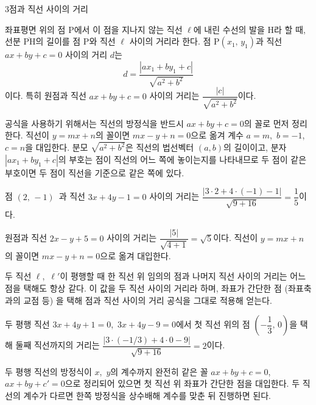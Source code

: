 \documentclass[10pt]{article}
\begin{document}
\begin{dmconcept}{3}{점과 직선 사이의 거리}
\setlength{\parskip}{2.0mm plus 2.1mm minus 0mm}\linespread{1.30}\selectfont%


좌표평면 위의 점 $\mathrm{P}$에서 이 점을 지나지 않는 직선 $\ell$에 내린 수선의 발을 $\mathrm{H}$라 할 때, 선분 $\overline{\mathrm{PH}}$의 길이를 점 $\mathrm{P}$와 직선 $\ell$ 사이의 거리라 한다. 점 $\mathrm{P}(x_1,\, y_1)$과 직선 $ax + by + c = 0$ 사이의 거리 $d$는
\begin{equation*}
  d = \frac{|ax_1 + by_1 + c|}{\sqrt{a^2 + b^2}}
\end{equation*}
이다. 특히 원점과 직선 $ax + by + c = 0$ 사이의 거리는 $\dfrac{|c|}{\sqrt{a^2 + b^2}}$이다.

\begin{dmexplain}
공식을 사용하기 위해서는 직선의 방정식을 반드시 $ax + by + c = 0$의 꼴로 먼저 정리한다. 직선이 $y = mx + n$의 꼴이면 $mx - y + n = 0$으로 옮겨 계수 $a = m$,\ $b = -1$,\ $c = n$을 대입한다. 분모 $\sqrt{a^2 + b^2}$은 직선의 법선벡터 $(a, b)$의 길이이고, 분자 $|ax_1 + by_1 + c|$의 부호는 점이 직선의 어느 쪽에 놓이는지를 나타내므로 두 점이 같은 부호이면 두 점이 직선을 기준으로 같은 쪽에 있다.
\end{dmexplain}

\begin{dmexample}
점 $(2,\, -1)$\ 과 직선 $3x + 4y - 1 = 0$ 사이의 거리는 $\dfrac{|3 \cdot 2 + 4 \cdot (-1) - 1|}{\sqrt{9 + 16}} = \dfrac{1}{5}$이다.
\end{dmexample}

\begin{dmexample}
원점과 직선 $2x - y + 5 = 0$ 사이의 거리는 $\dfrac{|5|}{\sqrt{4 + 1}} = \sqrt{5}$이다. 직선이 $y = mx + n$의 꼴이면 $mx - y + n = 0$으로 옮겨 대입한다.
\end{dmexample}


두 직선 $\ell$,\ $\ell'$이 평행할 때 한 직선 위 임의의 점과 나머지 직선 사이의 거리는 어느 점을 택해도 항상 같다. 이 값을 두 직선 사이의 거리라 하며, 좌표가 간단한 점 (좌표축과의 교점 등) 을 택해 점과 직선 사이의 거리 공식을 그대로 적용해 얻는다.

\begin{dmexample}
두 평행 직선 $3x + 4y + 1 = 0$,\ $3x + 4y - 9 = 0$에서 첫 직선 위의 점 $\left(-\dfrac{1}{3},\, 0\right)$을 택해 둘째 직선까지의 거리는 $\dfrac{|3 \cdot (-1/3) + 4 \cdot 0 - 9|}{\sqrt{9 + 16}} = 2$이다.
\end{dmexample}

\begin{dmnote}
두 평행 직선의 방정식이 $x$,\ $y$의 계수까지 완전히 같은 꼴 $ax + by + c = 0$,\ $ax + by + c' = 0$으로 정리되어 있으면 첫 직선 위 좌표가 간단한 점을 대입한다. 두 직선의 계수가 다르면 한쪽 방정식을 상수배해 계수를 맞춘 뒤 진행하면 된다.
\end{dmnote}

\vspace{60.0mm}%
\end{dmconcept}
\end{document}
